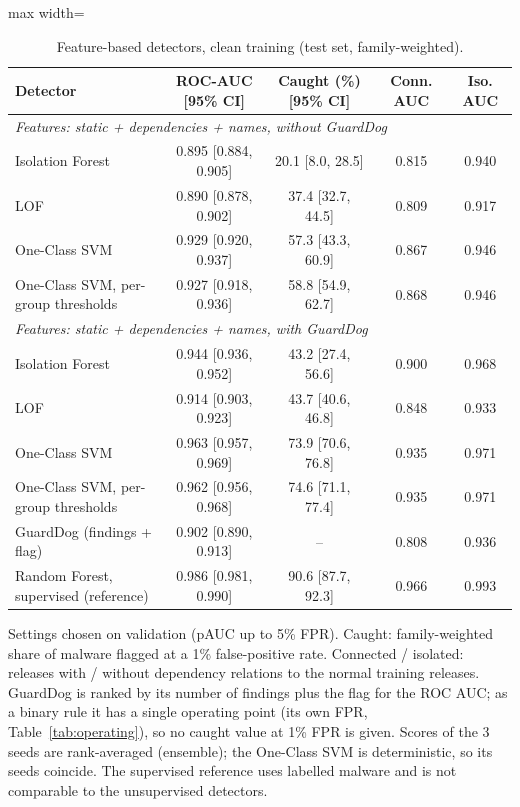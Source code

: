 \begin{table}[htbp]
\centering
\footnotesize
\caption{Feature-based detectors, clean training (test set, family-weighted).}
\label{tab:baselines}
\begin{adjustbox}{max width=\linewidth}
\begin{tabular}{lcccc}
\toprule
Detector & ROC-AUC [95\% CI] & Caught (\%) [95\% CI] & Conn. AUC & Iso. AUC \\
\midrule
\multicolumn{5}{l}{\textit{Features: static + dependencies + names, without GuardDog}} \\
Isolation Forest & 0.895 [0.884, 0.905] & 20.1 [8.0, 28.5] & 0.815 & 0.940 \\
LOF & 0.890 [0.878, 0.902] & 37.4 [32.7, 44.5] & 0.809 & 0.917 \\
One-Class SVM & 0.929 [0.920, 0.937] & 57.3 [43.3, 60.9] & 0.867 & 0.946 \\
One-Class SVM, per-group thresholds & 0.927 [0.918, 0.936] & 58.8 [54.9, 62.7] & 0.868 & 0.946 \\
\multicolumn{5}{l}{\textit{Features: static + dependencies + names, with GuardDog}} \\
Isolation Forest & 0.944 [0.936, 0.952] & 43.2 [27.4, 56.6] & 0.900 & 0.968 \\
LOF & 0.914 [0.903, 0.923] & 43.7 [40.6, 46.8] & 0.848 & 0.933 \\
One-Class SVM & 0.963 [0.957, 0.969] & 73.9 [70.6, 76.8] & 0.935 & 0.971 \\
One-Class SVM, per-group thresholds & 0.962 [0.956, 0.968] & 74.6 [71.1, 77.4] & 0.935 & 0.971 \\
\midrule
GuardDog (findings + flag) & 0.902 [0.890, 0.913] & -- & 0.808 & 0.936 \\
Random Forest, supervised (reference) & 0.986 [0.981, 0.990] & 90.6 [87.7, 92.3] & 0.966 & 0.993 \\
\bottomrule
\end{tabular}
\end{adjustbox}
\par\smallskip
\parbox{0.95\linewidth}{\footnotesize Settings chosen on validation (pAUC up to 5\% FPR). Caught: family-weighted share of malware flagged at a 1\% false-positive rate. Connected / isolated: releases with / without dependency relations to the normal training releases. GuardDog is ranked by its number of findings plus the flag for the ROC AUC; as a binary rule it has a single operating point (its own FPR, Table~\ref{tab:operating}), so no caught value at 1\% FPR is given. Scores of the 3 seeds are rank-averaged (ensemble); the One-Class SVM is deterministic, so its seeds coincide. The supervised reference uses labelled malware and is not comparable to the unsupervised detectors.}
\end{table}
